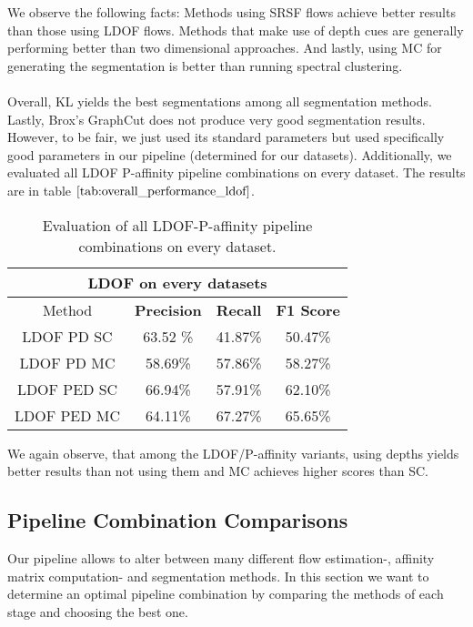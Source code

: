 We observe the following facts: Methods using SRSF flows achieve better results than those using LDOF flows. Methods that make use of depth cues are generally performing better than two dimensional approaches. And lastly, using MC for generating the segmentation is better than running spectral clustering. \\ \\
Overall, KL yields the best segmentations among all segmentation methods. Lastly, Brox's GraphCut does not produce very good segmentation results. However, to be fair, we just used its standard parameters but used specifically good parameters in our pipeline (determined for our datasets).
Additionally, we evaluated all LDOF P-affinity pipeline combinations on every dataset. The results are in table $\ref{tab:overall_performance_ldof}$.
\begin{table}[H]
\centering
\begin{tabular}{|c|c|c|c|}
\hline
\multicolumn{4}{|c|}{LDOF on every datasets}                        \\ \hline
Method & \textbf{Precision} & \textbf{Recall} & \textbf{F1 Score} \\ \hline
LDOF PD SC & 63.52 \%   & 41.87\%     & 50.47\%  \\ \hline
LDOF PD MC & 58.69\%   & 57.86\%     & 58.27\%  \\ \hline
LDOF PED SC & 66.94\%   & 57.91\%     & 62.10\%  \\ \hline
LDOF PED MC & 64.11\%   & 67.27\%     & 65.65\%  \\ \hline                 
\end{tabular}
\caption[Overall Performance LDOF P-Affinities]{Evaluation of all LDOF-P-affinity pipeline combinations on every dataset. }
\label{tab:overall_performance_ldof}
\end{table}
We again observe, that among the LDOF/P-affinity variants, using depths yields better results than not using them and MC achieves higher scores than SC.  

\subsection{Pipeline Combination Comparisons}
\label{sec:pipeline_combination_cmp}
Our pipeline allows to alter between many different flow estimation-, affinity matrix computation- and segmentation methods. In this section we want to determine an optimal pipeline combination by comparing the methods of each stage and choosing the best one.

